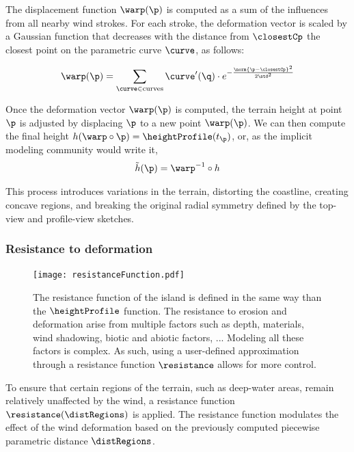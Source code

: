 The displacement function $\warp(\p)$ is computed as a sum of the influences from all nearby wind strokes. For each stroke, the deformation vector is scaled by a Gaussian function that decreases with the distance from $\closestCp$ the closest point on the parametric curve $\curve$, as follows:

\begin{align}
    \warp(\p) = \sum_{\curve \in \text{curves}} \curve'(\q) \cdot e^{-\frac{\norm{\p - \closestCp}^2}{2 \std^2}}
\end{align}


Once the deformation vector $\warp(\p)$ is computed, the terrain height at point $\p$ is adjusted by displacing $\p$ to a new point $\warp(\p)$.
We can then compute the final height $h(\warp \circ \p) = \heightProfile(t_{\p})$, or, as the implicit modeling community would write it, 
\begin{align}
    \Tilde{h}(\p) = \warp^{-1} \circ h
\end{align}

This process introduces variations in the terrain, distorting the coastline, creating concave regions, and breaking the original radial symmetry defined by the top-view and profile-view sketches.

\subsubsection{Resistance to deformation}

\begin{figure}[H]
	\centering
	\texttt{[image: resistanceFunction.pdf]}
    \caption{The resistance function of the island is defined in the same way than the $\heightProfile$ function. The resistance to erosion and deformation arise from multiple factors such as depth, materials, wind shadowing, biotic and abiotic factors, ... Modeling all these factors is complex. As such, using a user-defined approximation through a resistance function $\resistance$ allows for more control. }
    \label{fig:coral-island_resistance-function}
\end{figure}

To ensure that certain regions of the terrain, such as deep-water areas, remain relatively unaffected by the wind, a resistance function $\resistance(\distRegions)$ is applied. The resistance function modulates the effect of the wind deformation based on the previously computed piecewise parametric distance $\distRegions$.

